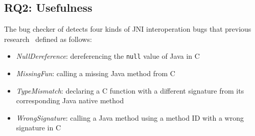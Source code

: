 \subsection{RQ2: Usefulness}

The bug checker of \ours detects four kinds of JNI interoperation bugs
that previous research~\cite{ILEA, LeeASE20} defined as follows:

\begin{itemize}
  \item {\it NullDereference}: dereferencing the {\tt null} value of Java in C
  \item {\it MissingFun}: calling a missing Java method from C
  \item {\it TypeMismatch}: declaring a C function with a different signature
    from its corresponding Java native method
  \item {\it WrongSignature}: calling a Java method using a method ID with a
    wrong signature in C
\end{itemize}


